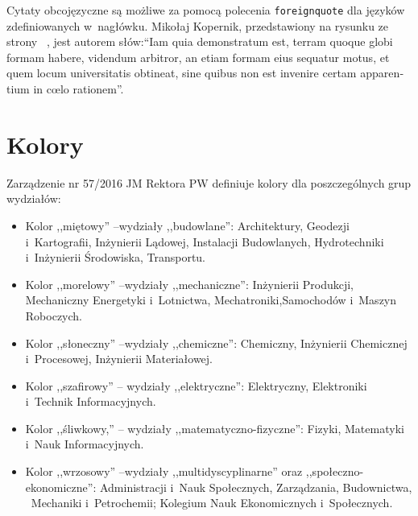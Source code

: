 Cytaty obcojęzyczne są możliwe za pomocą polecenia \texttt{foreignquote}
dla języków zdefiniowanych w~nagłówku. Mikołaj Kopernik, przedstawiony na rysunku ze strony~\pageref{rys:kopernik}
, jest autorem słów:\foreignquote{latin}
{Iam quia demonstratum est, terram quoque globi formam habere, videndum arbitror, an etiam formam eius sequatur motus,
    et quem locum universitatis obtineat, sine quibus non est invenire certam apparentium in cœlo rationem}.



\section{Kolory}
Zarządzenie nr 57/2016 JM Rektora PW definiuje kolory dla poszczególnych grup wydziałów:
\begin{itemize}
    \item Kolor ,,miętowy'' --\colorbox{bud}{wydziały ,,budowlane'':}
    {\color{bud} Architektury, Geodezji i~Kartografii, Inżynierii Lądowej, Instalacji Budowlanych,
        Hydrotechniki i~Inżynierii Środowiska, Transportu.}
    \item Kolor ,,morelowy'' --\colorbox{mech}{wydziały ,,mechaniczne'':}
    {\color{mech} Inżynierii Produkcji, Mechaniczny Energetyki i~Lotnictwa, Mechatroniki,Samochodów i~Maszyn Roboczych.}
    \item Kolor ,,słoneczny'' --\colorbox{chem}{wydziały ,,chemiczne'':}
    {\color{chem} Chemiczny, Inżynierii Chemicznej i~Procesowej, Inżynierii Materiałowej.}
    \item Kolor ,,szafirowy'' --
    \colorbox{elek}{wydziały ,,elektryczne'':}{\color{elek} Elektryczny, Elektroniki i~Technik Informacyjnych.}
    \item Kolor ,,śliwkowy,'' --
    \colorbox{mfiz}{wydziały ,,matematyczno-fizyczne'':}{\color{mfiz} Fizyki, Matematyki i~Nauk Informacyjnych.}
    \item Kolor ,,wrzosowy'' --\colorbox{multi}{wydziały ,,multidyscyplinarne'' oraz ,,społeczno-ekonomiczne'':}
    {\color{multi} Administracji i~Nauk Społecznych, Zarządzania, Budownictwa,
        ~Mechaniki i~Petrochemii; Kolegium Nauk Ekonomicznych i~Społecznych.}
\end{itemize}

